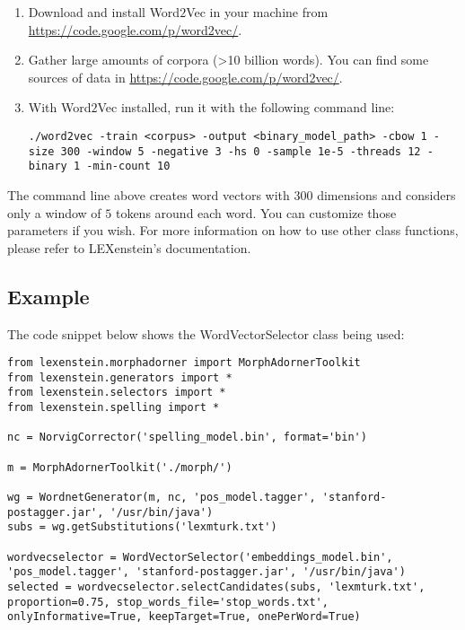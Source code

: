 \begin{enumerate}
\item Download and install Word$2$Vec in your machine from \url{https://code.google.com/p/word2vec/}.
\item Gather large amounts of corpora (>10 billion words). You can find some sources of data in \url{https://code.google.com/p/word2vec/}.
\item With Word$2$Vec installed, run it with the following command line:

\begin{lstlisting}
./word2vec -train <corpus> -output <binary_model_path> -cbow 1 -size 300 -window 5 -negative 3 -hs 0 -sample 1e-5 -threads 12 -binary 1 -min-count 10
\end{lstlisting}
\end{enumerate}

The command line above creates word vectors with $300$ dimensions and considers only a window of $5$ tokens around each word. You can customize those parameters if you wish. For more information on how to use other class functions, please refer to LEXenstein's documentation.

\subsection{Example}

The code snippet below shows the WordVectorSelector class being used:

\begin{lstlisting}
from lexenstein.morphadorner import MorphAdornerToolkit
from lexenstein.generators import *
from lexenstein.selectors import *
from lexenstein.spelling import *

nc = NorvigCorrector('spelling_model.bin', format='bin')

m = MorphAdornerToolkit('./morph/')

wg = WordnetGenerator(m, nc, 'pos_model.tagger', 'stanford-postagger.jar', '/usr/bin/java')
subs = wg.getSubstitutions('lexmturk.txt')

wordvecselector = WordVectorSelector('embeddings_model.bin', 'pos_model.tagger', 'stanford-postagger.jar', '/usr/bin/java')
selected = wordvecselector.selectCandidates(subs, 'lexmturk.txt', proportion=0.75, stop_words_file='stop_words.txt', onlyInformative=True, keepTarget=True, onePerWord=True)
\end{lstlisting}









